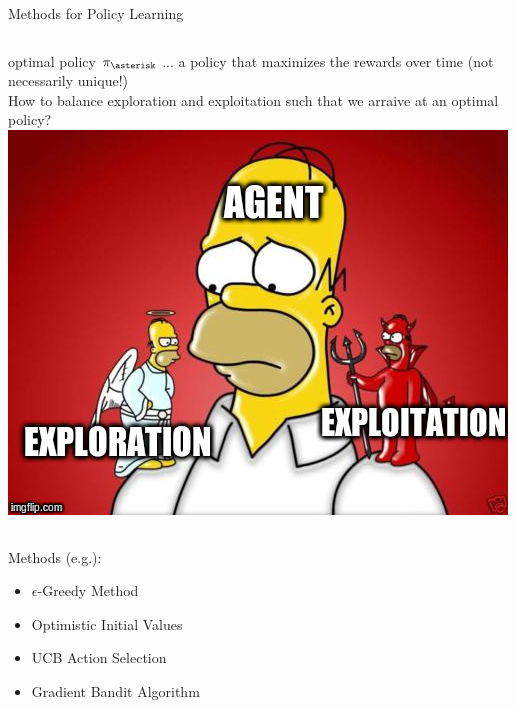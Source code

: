 \documentclass{beamer}
\begin{document}
\begin{frame}{Methods for Policy Learning}
	\begin{columns}
optimal policy $\pi_{\asterisk}$ ... a policy that maximizes the rewards over time (not necessarily unique!) \\
\vspace{0.3cm}
How to balance exploration and exploitation such that we arraive at an optimal policy?\\
\vspace{0.3cm}
	\includegraphics[width=\linewidth]{Images/exploration.jpg} \\[\baselineskip]
	\end{columns} 
Methods (e.g.):
\begin{itemize}
\item $\epsilon$-Greedy Method
\item Optimistic Initial Values
\item UCB Action Selection
\item Gradient Bandit Algorithm
\end{itemize}
\end{frame}
\end{document}
